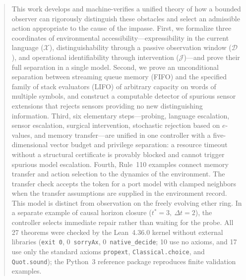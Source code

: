 \documentclass[11pt,a4paper]{article}
\theoremstyle{cleanthm}
\DeclareRobustCommand{\id}[1]{\allowbreak\nolinkurl{#1}\allowbreak}
\begin{document}
\begin{abstract}
This work develops and machine-verifies a unified theory of how a bounded observer can rigorously distinguish these obstacles and select an admissible action appropriate to the cause of the impasse. First, we formalize three coordinates of environmental accessibility---expressibility in the current language ($\mathcal X$), distinguishability through a passive observation window ($\mathcal D$), and operational identifiability through intervention ($\mathcal J$)---and prove their full separation in a single model. Second, we prove an unconditional separation between streaming queue memory (FIFO) and the specified family of stack evaluators (LIFO) of arbitrary capacity on words of multiple symbols, and construct a computable detector of spurious sensor extensions that rejects sensors providing no new distinguishing information. Third, six elementary steps---probing, language escalation, sensor escalation, surgical intervention, stochastic rejection based on $e$-values, and memory transfer---are unified in one controller with a five-dimensional vector budget and privilege separation: a resource timeout without a structural certificate is provably blocked and cannot trigger spurious model escalation. Fourth, Rule~110 examples connect memory transfer and action selection to the dynamics of the environment. The transfer check accepts the token for a port model with clamped neighbors when the transfer assumptions are supplied in the environment record. This model is distinct from observation on the freely evolving ether ring. In a separate example of causal horizon closure ($t^*=3,\ \Delta t=2$), the controller selects immediate repair rather than waiting for the probe. All 27 theorems were checked by the Lean~4.36.0 kernel without external libraries (\id{exit 0}, 0~\id{sorryAx}, 0~\id{native_decide}; 10 use no axioms, and 17 use only the standard axioms \id{propext}, \id{Classical.choice}, and \id{Quot.sound}); the Python~3 reference package reproduces finite validation examples.
\end{abstract}
\end{document}
